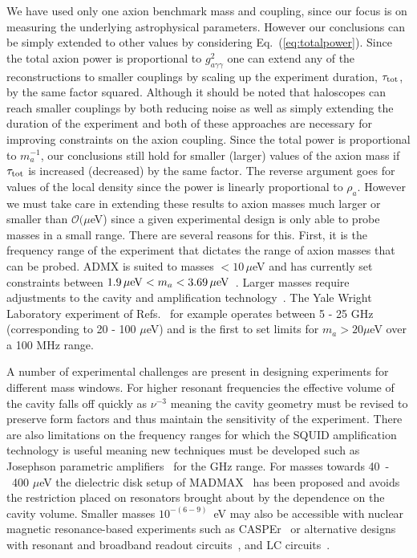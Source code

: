 We have used only one axion benchmark mass and coupling, since our focus is on measuring the underlying astrophysical parameters. However our conclusions can be simply extended to other values by considering Eq.~(\ref{eq:totalpower}). Since the total axion power is proportional to $g_{a\gamma\gamma}^2$ one can extend any of the reconstructions to smaller couplings by scaling up the experiment duration, $\tau_{\rm tot}$, by the same factor squared. Although it should be noted that haloscopes can reach smaller couplings by both reducing noise as well as simply extending the duration of the experiment and both of these approaches are necessary for improving constraints on the axion coupling. Since the total power is proportional to $m_a^{-1}$, our conclusions still hold for smaller (larger) values of the axion mass if $\tau_{\rm tot}$ is increased (decreased) by the same factor. The reverse argument goes for values of the local density since the power is linearly proportional to $\rho_a$. However we must take care in extending these results to axion masses much larger or smaller than $\mathcal{O}(\mu$eV) since a given experimental design is only able to probe masses in a small range. There are several reasons for this. First, it is the frequency range of the experiment that dictates the range of axion masses that can be probed. ADMX is suited to masses $<10\, \mu$eV and has currently set constraints between $1.9\,\mu{\rm eV} < m_a < 3.69\,\mu{\rm eV}$~\cite{Asztalos:2009yp,Hoskins:2011iv}. Larger masses require adjustments to the cavity and amplification technology~\cite{Slocum:2014gwa,Baker:2011na}. The Yale Wright Laboratory experiment of Refs.~\cite{Brubaker:2016ktl,Kenany:2016tta} for example operates between 5 - 25 GHz (corresponding to 20 - 100 $\mu$eV) and is the first to set limits for $m_a>20 \mu$eV over a 100 MHz range. 

A number of experimental challenges are present in designing experiments for different mass windows. For higher resonant frequencies the effective volume of the cavity falls off quickly as $\nu^{-3}$ meaning the cavity geometry must be revised to preserve form factors and thus maintain the sensitivity of the experiment. There are also limitations on the frequency ranges for which the SQUID amplification technology is useful meaning new techniques must be developed such as Josephson parametric amplifiers~\cite{Kenany:2016tta} for the GHz range. For masses towards 40~-~400 $\mu$eV the dielectric disk setup of MADMAX~\cite{TheMADMAXWorkingGroup:2016hpc,Millar:2016cjp} has been proposed and avoids the restriction placed on resonators brought about by the dependence on the cavity volume. Smaller masses $10^{-(6-9)}$~eV may also be accessible with nuclear magnetic resonance-based experiments such as CASPEr~\cite{Budker:2013hfa,Graham:2013gfa} or alternative designs with resonant and broadband readout circuits~\cite{Kahn:2016aff}, and LC circuits~\cite{Sikivie:2013laa}.

